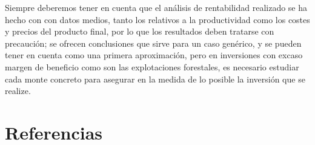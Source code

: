 \documentclass[
]{article}
\begin{document}
Siempre deberemos tener en cuenta que el análisis de rentabilidad
realizado se ha hecho con con datos medios, tanto los relativos a la
productividad como los costes y precios del producto final, por lo que
los resultados deben tratarse con precaución; se ofrecen conclusiones
que sirve para un caso genérico, y se pueden tener en cuenta como una
primera aproximación, pero en inversiones con excaso margen de beneficio
como son las explotaciones forestales, es necesario estudiar cada monte
concreto para asegurar en la medida de lo posible la inversión que se
realize.

\hypertarget{referencias}{%
\section{Referencias}\label{referencias}}
\end{document}
